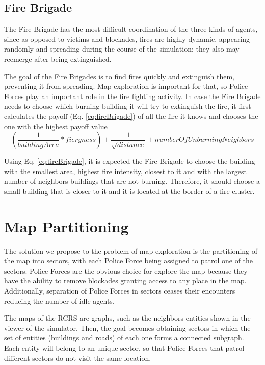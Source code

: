\documentclass{llncs}
\begin{document}
\subsection{Fire Brigade}
\label{subsec:fireBrigade}
The Fire Brigade has the most difficult coordination of the three kinds of agents, since as opposed to victims and blockades, fires are highly dynamic, appearing randomly and spreading during the course of the simulation; they also may reemerge after being extinguished.

The goal of the Fire Brigades is to find fires quickly and extinguish them, preventing it from spreading. Map exploration is important for that, so Police Forces play an important role in the fire fighting activity. In case the Fire Brigade needs to choose which burning building it will try to extinguish the fire, it first calculates the payoff (Eq. \ref{eq:fireBrigade}) of all the fire it knows and chooses the one with the highest payoff value
\begin{equation}
\label{eq:fireBrigade}
\left(\frac{1}{buildingArea} * fieryness\right) + \frac{1}{\sqrt{distance}} + numberOfUnburningNeighbors
\end{equation}

Using Eq. \ref{eq:fireBrigade}, it is expected the Fire Brigade to choose the building with the smallest area, highest fire intensity, closest to it and with the largest number of neighbors buildings that are not burning. Therefore, it should choose a small building that is closer to it and it is located at the border of a fire cluster.
\section{Map Partitioning}
\label{sec:partitioning}
The solution we propose to the problem of map exploration is the partitioning of the map into sectors, with each Police Force being assigned to patrol one of the sectors. Police Forces are the obvious choice for explore the map because they have the ability to remove blockades granting access to any place in the map. Additionally, separation of Police Forces in sectors ceases their encounters reducing the number of idle agents.

The maps of the RCRS are graphs, such as the neighbors entities shown in the viewer of the simulator. Then, the goal becomes obtaining sectors in which the set of entities (buildings and roads) of each one forms a connected subgraph. Each entity will belong to an unique sector, so that Police Forces that patrol different sectors do not visit the same location.
\end{document}
